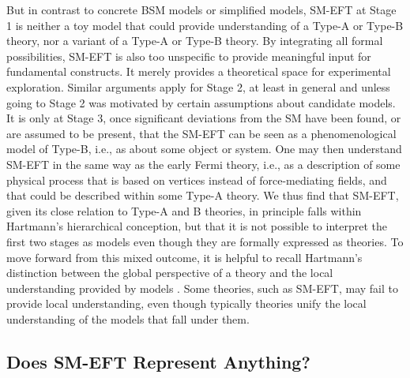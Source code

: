 But in contrast to concrete BSM models or simplified models, SM-EFT at Stage 1 is neither a toy model \citep[see][]{Reutlinger2018} that could provide understanding of a Type-A or Type-B theory, nor a variant of a Type-A or Type-B theory. 
By integrating all formal possibilities, SM-EFT is also too unspecific to provide meaningful input for fundamental constructs. 
It merely provides a theoretical space for experimental exploration.
Similar arguments apply for Stage 2, at least in general and unless going to Stage 2 was motivated by certain assumptions about candidate models. 
It is only at Stage 3, once significant deviations from the SM have been found, or are assumed to be present, that the SM-EFT can be seen as
a phenomenological model of Type-B, i.e., as about some object or system.
One may then understand SM-EFT in the same way as the early Fermi theory, i.e., as a description of some physical process that is based on vertices instead of force-mediating fields, and that could be described within some Type-A theory.
We thus find that SM-EFT, given its close relation to Type-A and B theories, in principle falls within Hartmann's hierarchical conception, but that it is not possible to interpret the first two stages as models even though they are formally expressed as theories. 
To move forward from this mixed outcome, it is helpful to recall Hartmann's distinction between the global perspective of a theory and the local understanding provided by models \citep{hartmann2001}. 
Some theories, such as SM-EFT, may fail to provide local understanding, even though typically theories unify the local understanding of the models that fall under them.


\subsection{Does SM-EFT Represent Anything?}
\label{sub:smeftrep} 

